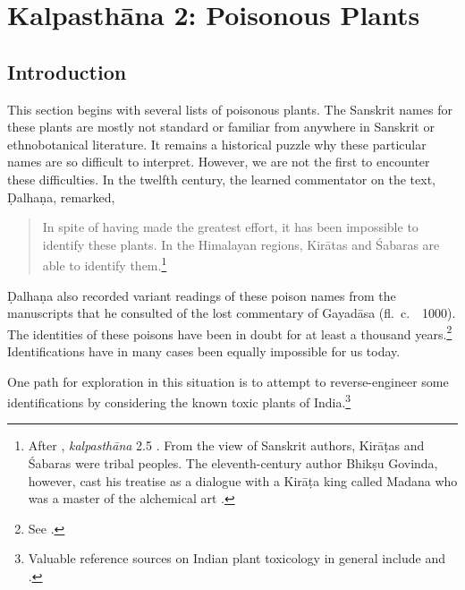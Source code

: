 \newcommand{\plant}[4]{#1 (\emph{#2})\footnoteA{#3; see #4}}
\let\chemical = \plant
\newcommand{\skt}[2]{#1 (\emph{#2})}
\newcommand{\sskt}[2]{\empty}
%

\chapter{Kalpasthāna 2: Poisonous Plants}

\section{Introduction}

This section begins with several lists of poisonous plants.  The Sanskrit names
for these plants are mostly not standard or familiar from anywhere in Sanskrit or
ethnobotanical literature.  It remains a historical puzzle why these particular
names are so difficult to interpret. However, we are not the first to encounter
these difficulties. In the twelfth century, the learned commentator on the text,
Ḍalhaṇa, remarked,
\begin{quote}
In spite of having made the greatest effort, it has been impossible to identify
these plants. In the Himalayan regions, Kirātas and Śabaras are able to identify
them.\footnote{After \SS, \emph{kalpasthāna} 2.5 \citep[564]{vulgate}. From the
view of Sanskrit authors, Kirāṭas and Śabaras were tribal peoples.  The
eleventh-century author Bhikṣu Govinda, however, cast his treatise as a dialogue 
with a
Kirāṭa king called Madana who was a master of the alchemical art \citep[IIA,
620]{meul-hist}.}
\end{quote}
Ḍalhaṇa also recorded variant readings of these poison names from the manuscripts
that he consulted of the lost commentary of Gayadāsa (fl.\ c.\ \AD\ 1000). The
identities of these poisons have been in doubt for at least a thousand
years.\footnote{See \cite[80--81]{wuja-2003}.}  Identifications have in many cases
    been equally impossible for us today.

One path for exploration in this situation is to attempt to reverse-engineer some 
identifications by considering the known toxic plants of India.\footnote{Valuable 
reference sources on Indian plant toxicology in general include 
\cite[chs.\,10, 11]{pill-2013} and \cite[parts 1.II, 3 and 4]{barc-2008}.}


